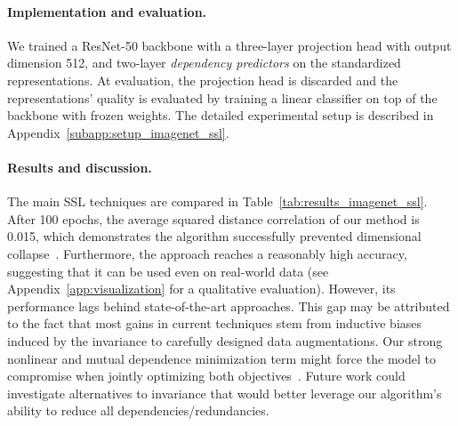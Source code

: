 \paragraph{Implementation and evaluation.} We trained a ResNet-50 backbone with a three-layer projection head with output dimension 512, and two-layer \textit{dependency predictors} on the standardized representations. 
At evaluation, the projection head is discarded and the representations' quality is evaluated by training a linear classifier on top of the backbone with frozen weights. 
The detailed experimental setup is described in Appendix~\ref{subapp:setup_imagenet_ssl}. 

\paragraph{Results and discussion.} The main SSL techniques are compared in Table~\ref{tab:results_imagenet_ssl}. 
After 100 epochs, the average squared distance correlation of our method is 0.015, which demonstrates the algorithm successfully prevented dimensional collapse~\citep{jing2021understand_ssl_dim_collapse}. 
Furthermore, the approach reaches a reasonably high accuracy, suggesting that it can be used even on real-world data (see Appendix~\ref{app:visualization} for a qualitative evaluation). %
However, its performance lags behind state-of-the-art approaches. This gap may be attributed to the fact that most gains in current techniques stem from inductive biases induced by the invariance to carefully designed data augmentations. Our strong nonlinear and mutual dependence minimization term might force the model to compromise when jointly optimizing both objectives~\citep{li2019pairwise_ssl}. 
Future work could investigate alternatives to invariance that would better leverage our algorithm's ability to reduce all dependencies/redundancies. 

